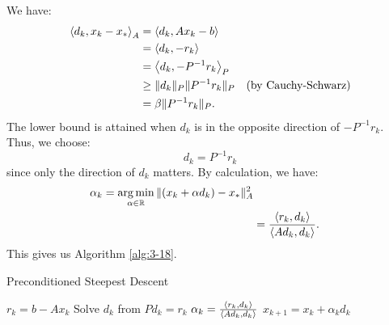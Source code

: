 \documentclass[../main/main.tex]{subfiles}
\begin{document}
We have: \begin{align*}
           \left\langle{d_{k}},{x_{k}-x_{*}}\right\rangle_{A} &= \left\langle{d_{k}},{Ax_{k}-b}\right\rangle \\
                                          &=\left\langle{d_{k}},{-r_{k}}\right\rangle\\
                                          &=\left\langle{d_{k}},{-P^{-1}r_{k}}\right\rangle_{P}\\
           &\geq  \|d_{k}\|_{P}\|P^{-1}r_{k}\|_{P} \quad (\text{by Cauchy-Schwarz})\\
             &= \beta  \|P^{-1}r_{k}\|_{P}
           .\end{align*}
         The lower bound is attained when $d_{k}$ is in the opposite direction of $-P^{-1}r_{k}$. Thus, we choose: \[
d_{k} = P^{-1} r_{k}
\] since only the direction of $d_{k}$ matters. By calculation, we have: \begin{align*}
                                                                           \alpha _{k} = \operatorname*{arg\,min}_{\alpha  \in \mathbb{R} }\|(x_{k}+\alpha d_{k})-x_{*}\|^2_{A}\\
                                                                           &=\frac{\left\langle{r_{k}},{d_{k}}\right\rangle}{\left\langle{Ad_{k}},{d_{k}}\right\rangle}
                                                                           .\end{align*}
                                                                         This gives us Algorithm \ref{alg:3-18}.
                                                                         \begin{algorithm}[h!]
                                                                           \caption{Preconditioned Steepest Descent}\label{alg:3-18}
                                                                           \begin{algorithmic}[1]
                                                                            \State $r_{k}=b-Ax_{k}$
                                                                            \State Solve $d_{k}$ from $Pd_{k}=r_{k}$
                                                                            \State $\alpha _{k} = \frac{\left\langle{r_{k}},{d_{k}}\right\rangle}{\left\langle{Ad_{k}},{d_{k}}\right\rangle} $
                                                                            \State $x_{k+1}= x_{k}+\alpha _{k}d_{k}$
                                                                            \EndFor
                                                                           \end{algorithmic}
                                                                         \end{algorithm}
\end{document}
